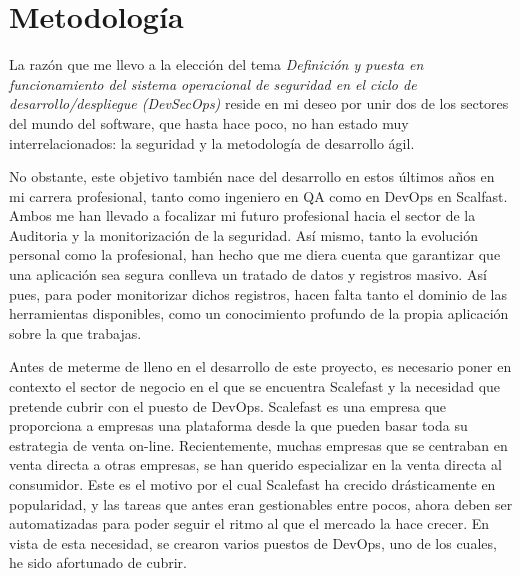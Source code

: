 \documentclass[12pt]{report} %
\begin{document}
	














\clearpage
{} %


\chapter{Metodología}


La razón que me llevo a la elección del tema \textit{Definición y puesta en
funcionamiento del sistema operacional de seguridad en el ciclo de
desarrollo/despliegue (DevSecOps)} reside en mi deseo por unir dos de los
sectores del mundo del software, que hasta hace poco, no han estado muy
interrelacionados: la seguridad y la metodología de desarrollo ágil.

No obstante, este objetivo también nace del desarrollo en estos últimos años en
mi carrera profesional, tanto como ingeniero en QA como en DevOps en Scalfast.
Ambos me han llevado a focalizar mi futuro profesional hacia el sector de la
Auditoria y la monitorización de la seguridad. Así mismo, tanto la evolución
personal como la  profesional, han hecho que me diera cuenta que garantizar que
una aplicación sea segura conlleva un tratado de datos y registros masivo. Así
pues, para poder monitorizar dichos registros, hacen falta tanto el dominio de
las herramientas disponibles, como un conocimiento profundo de la propia
aplicación sobre la que trabajas.

Antes de meterme de lleno en el desarrollo de este proyecto, es necesario poner
en contexto el sector de negocio en el que se encuentra Scalefast y la necesidad
que pretende cubrir con el puesto de \gls{DevOps}.  Scalefast es una empresa que
proporciona a empresas una plataforma desde la que pueden basar toda su
estrategia de venta on-line.  Recientemente, muchas empresas que se centraban en
venta directa a otras empresas, se han querido especializar en la venta directa
al consumidor.  Este es el motivo por el cual Scalefast ha crecido drásticamente
en popularidad, y las tareas que antes eran gestionables entre pocos, ahora
deben ser automatizadas para poder seguir el ritmo al que el mercado la hace
crecer.  En vista de esta necesidad, se crearon varios puestos de \gls{DevOps},
uno de los cuales, he sido afortunado de cubrir.
\end{document}
